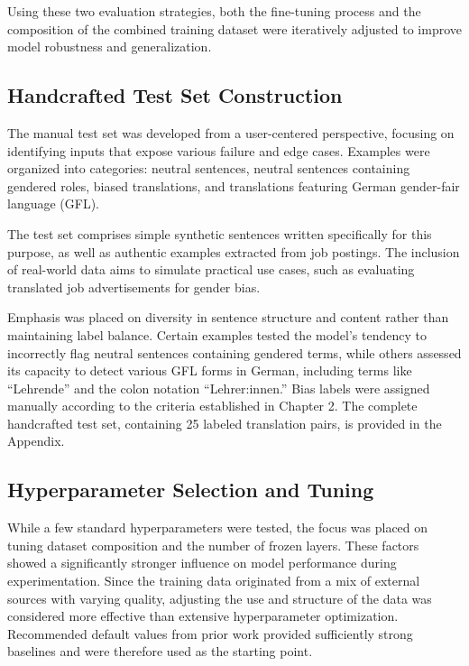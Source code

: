     Using these two evaluation strategies, both the fine-tuning process and the composition of the combined training dataset were iteratively adjusted to improve model robustness and generalization.

\subsection{Handcrafted Test Set Construction} \label{subsection:eval_dataset}
    The manual test set was developed from a user-centered perspective, focusing on identifying inputs that expose various failure and edge cases. Examples were organized into categories: neutral sentences, neutral sentences containing gendered roles, biased translations, and translations featuring German gender-fair language (GFL). 

    The test set comprises simple synthetic sentences written specifically for this purpose, as well as authentic examples extracted from job postings. The inclusion of real-world data aims to simulate practical use cases, such as evaluating translated job advertisements for gender bias.

    Emphasis was placed on diversity in sentence structure and content rather than maintaining label balance. Certain examples tested the model’s tendency to incorrectly flag neutral sentences containing gendered terms, while others assessed its capacity to detect various GFL forms in German, including terms like “Lehrende” and the colon notation “Lehrer:innen.” Bias labels were assigned manually according to the criteria established in Chapter 2. The complete handcrafted test set, containing 25 labeled translation pairs, is provided in the Appendix.

\subsection{Hyperparameter Selection and Tuning} \label{subsection:hyperparameter_tuning_methodology}
     While a few standard hyperparameters were tested, the focus was placed on tuning dataset composition and the number of frozen layers. These factors showed a significantly stronger influence on model performance during experimentation. Since the training data originated from a mix of external sources with varying quality, adjusting the use and structure of the data was considered more effective than extensive hyperparameter optimization. Recommended default values from prior work provided sufficiently strong baselines and were therefore used as the starting point.

